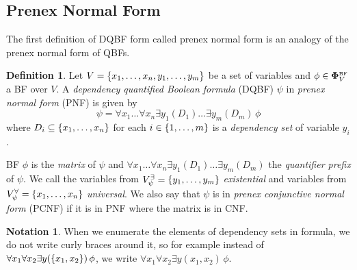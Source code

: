 \documentclass[
  digital, %
  color,
  twoside, %
  table,   %
  nolof,     %
  nolot,     %
]{fithesis3}
\let\setbuilder\set
\newcommand{\simpleset}[1]{\{{#1}\}}
\renewcommand{\set}[1]{\normalexpandarg\IfSubStr{#1}{|}{\setbuilder{#1}}{\simpleset{#1}}}
\theoremstyle{definition}
\newtheorem{definition}{Definition}
\newtheorem*{notation}{Notation}
\theoremstyle{remark}
\newcommand{\BF}[1]{\mathbf{\Phi}_{#1}^{\normalfont{\text{\tiny BF}}}}
\newcommand{\evars}[1]{V_{#1}^{\exists}}
\newcommand{\uvars}[1]{V_{#1}^{\forall}}
\newcommand{\itholds}{\,}
\begin{document}
\subsection{Prenex Normal Form}
The first definition of DQBF form called prenex normal form is an analogy of the prenex normal form of QBFs.

\begin{definition}
  Let $V = \set{x_1, \dots, x_n, y_1, \dots, y_m}$ be a set of variables and $\phi \in \BF{V}$ a BF over $V$. A \emph{dependency quantified Boolean formula} (DQBF) $\psi$ in \emph{prenex normal form} (PNF) is given by
  \[\psi = \forall x_1 \dots \forall x_n \exists y_1 (D_1) \dots \exists y_m (D_m) \itholds \phi\]
  where $D_i \subseteq \set{x_1, \dots, x_n}$ for each $i \in \set{1,\dots,m}$ is a \emph{dependency set} of variable $y_i$.
  \label{def:DQBF:PNF}
\end{definition}
BF $\phi$ is the \emph{matrix} of $\psi$ and $\forall x_1 \dots \forall x_n \exists y_1 (D_1) \dots \exists y_m (D_m)$ the \emph{quantifier prefix} of $\psi$. We call the variables from $\evars{\psi} = \set{y_1,\dots,y_m}$ \emph{existential} and variables from $\uvars{\psi} = \set{x_1,\dots,x_n}$ \emph{universal}. We also say that $\psi$ is in \emph{prenex conjunctive normal form} (PCNF) if it is in PNF where the matrix is in CNF.

\begin{notation}
When we enumerate the elements of dependency sets in formula, we do not write curly braces around it, so for example instead of $\forall x_1 \forall x_2 \exists y (\set{x_1,x_2}) \itholds \phi$, we write $\forall x_1 \forall x_2 \exists y (x_1,x_2) \itholds \phi$.
\end{notation}
\end{document}
